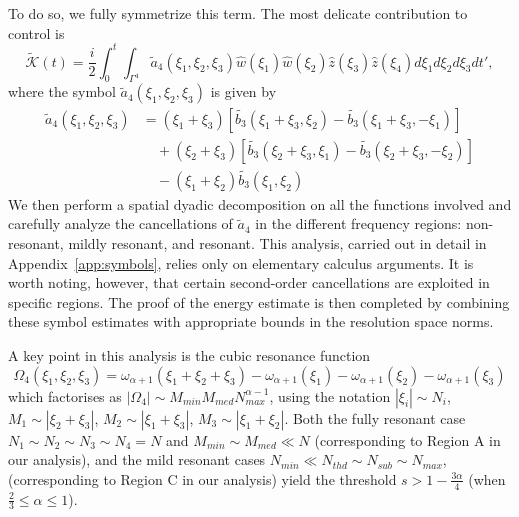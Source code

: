 \documentclass{amsart}
\theoremstyle{definition}
\theoremstyle{remark}
\numberwithin{equation}{section}
\begin{document}
To do so, we fully symmetrize this term. The most delicate contribution to control is 
\[ \widetilde{\mathcal{K}}(t) = \frac i2\int_0^t\int_{\Gamma^4} \widetilde{a}_4(\xi_1, \xi_2, \xi_3)  \widehat{w}(\xi_1) \widehat{w}(\xi_2) \widehat{z}(\xi_3) \widehat{z}(\xi_4)d\xi_1d\xi_2d\xi_3dt' , \]
where the symbol $\widetilde{a}_4(\xi_1, \xi_2, \xi_3)$ is given by 
\begin{align*}
\widetilde{a}_4(\xi_1, \xi_2, \xi_3) &= (\xi_1+\xi_3)\left[\widetilde{b_3}(\xi_1+\xi_3, \xi_2) - \widetilde{b_3}(\xi_1+\xi_3, -\xi_1)\right] \nonumber \\
&\quad + (\xi_2+\xi_3)\left[\widetilde{b_3}(\xi_2+\xi_3, \xi_1) - \widetilde{b_3}(\xi_2+\xi_3, -\xi_2)\right] \nonumber \\
&\quad - (\xi_1+\xi_2)\widetilde{b_3}(\xi_1, \xi_2) \nonumber %
\end{align*}
We then perform a spatial dyadic decomposition on all the functions involved and carefully analyze the cancellations of $\widetilde{a}_4$  in the different frequency regions: non-resonant, mildly resonant, and resonant. This analysis, carried out in detail in Appendix~\ref{app:symbols}, relies only on elementary calculus arguments. It is worth noting, however, that certain second-order cancellations are exploited in specific regions. The proof of the energy estimate is then completed by combining these symbol estimates with appropriate bounds in the resolution space norms. 

A key point in this analysis is the cubic resonance function
 \[\Omega_4(\xi_1,\xi_2,\xi_3)= \omega_{\alpha+1}(\xi_1+\xi_2+\xi_3)-\omega_{\alpha+1}(\xi_1)-\omega_{\alpha+1}(\xi_2)-\omega_{\alpha+1}(\xi_3)\]
 which factorises as $|\Omega_4| \sim M_{min}M_{med}N_{max}^{\alpha-1}$, using the notation $|\xi_i|\sim N_i$, $M_1\sim|\xi_2+\xi_3|$, $M_2\sim |\xi_1+\xi_3|$, $M_3\sim |\xi_1+\xi_2|$. Both the fully resonant case $N_1 \sim N_2 \sim N_3 \sim N_4=N$ and $M_{min} \sim M_{med} \ll N$ (corresponding to Region A in our analysis), and the mild resonant cases $N_{min} \ll N_{thd} \sim N_{sub} \sim N_{max}$, (corresponding to Region C in our analysis) yield the threshold $s>1-\frac{3\alpha}4$ (when $\frac23 \le \alpha \le 1$).
 
\end{document}
